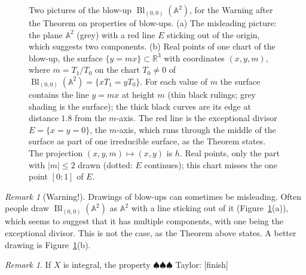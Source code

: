 \documentclass[12pt]{article}
\numberwithin{equation}{section}
\theoremstyle{definition}
\theoremstyle{remark}
\newtheorem{remark}[theorem]{Remark}
\newcommand{\RR}{\mathbb{R}}
\renewcommand{\AA}{\mathbb{A}}
\newcommand{\Bl}{\operatorname{Bl}}
\newcommand{\taylor}[1]{{\color{blue} \sf $\spadesuit\spadesuit\spadesuit$ Taylor: [#1]}}
\begin{document}
\begin{figure}[H]
\centering

\caption{Two pictures of the blow-up $\Bl_{(0,0)}(\AA^2)$, for the Warning after the Theorem on properties of blow-ups. (a) The misleading picture: the plane $\AA^2$ (grey) with a red line $E$ sticking out of the origin, which suggests two components. (b) Real points of one chart of the blow-up, the surface $\{y=mx\}\subset\RR^3$ with coordinates $(x,y,m)$, where $m=T_1/T_0$ on the chart $T_0\neq0$ of $\Bl_{(0,0)}(\AA^2)=\{xT_1=yT_0\}$. For each value of $m$ the surface contains the line $y=mx$ at height $m$ (thin black rulings; grey shading is the surface); the thick black curves are its edge at distance $1.8$ from the $m$-axis. The red line is the exceptional divisor $E=\{x=y=0\}$, the $m$-axis, which runs through the middle of the surface as part of one irreducible surface, as the Theorem states. The projection $(x,y,m)\mapsto(x,y)$ is $h$. Real points, only the part with $|m|\le 2$ drawn (dotted: $E$ continues); this chart misses the one point $[0:1]$ of $E$.}\label{fig:blowup-plane-real}
\end{figure}

\begin{remark}[Warning!]
	Drawings of blow-ups can sometimes be misleading. 
	Often people draw $\Bl_{(0,0)}(\AA^2)$ as $\AA^2$ with a line sticking out of it (Figure~\ref{fig:blowup-plane-real}(a)), which seems to suggest that it has multiple components, with one being the exceptional divisor. 
	This is not the case, as the Theorem above states. 
	A better drawing is Figure~\ref{fig:blowup-plane-real}(b).
\end{remark}

\begin{remark}
	If $X$ is integral, the property \taylor{finish}
\end{remark}
\end{document}
